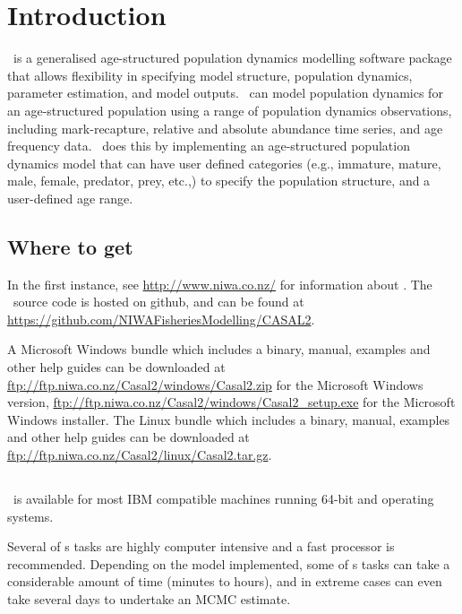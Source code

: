 \section{Introduction\label{sec:Introduction}}

\CNAME\ is a generalised age-structured population dynamics modelling software package that allows flexibility in specifying model structure, population dynamics, parameter estimation, and model outputs. \CNAME\ can model population dynamics for an age-structured population using a range of population dynamics observations, including mark-recapture, relative and absolute abundance time series, and age frequency data. \CNAME\ does this by implementing an age-structured population dynamics model that can have user defined categories (e.g., immature, mature, male, female, predator, prey, etc.,) to specify the population structure, and a user-defined age range. 

\subsection{Where to get \CNAME }

In the first instance, see \url{http://www.niwa.co.nz/} for information about \CNAME . The \CNAME\ source code is hosted on github, and can be found at \url{https://github.com/NIWAFisheriesModelling/CASAL2}.

A Microsoft Windows bundle which includes a binary, manual, examples and other help guides can be downloaded at \url{ftp://ftp.niwa.co.nz/Casal2/windows/Casal2.zip} for the Microsoft Windows version, \url{ftp://ftp.niwa.co.nz/Casal2/windows/Casal2_setup.exe} for the Microsoft Windows installer. The Linux bundle which includes a binary, manual, examples and other help guides can be downloaded at \url{ftp://ftp.niwa.co.nz/Casal2/linux/Casal2.tar.gz}.

\subsection{}

\CNAME\ is available for most IBM compatible machines running 64-bit  and  operating systems.

Several of \CNAME s tasks are highly computer intensive and a fast processor is recommended. Depending on the model implemented, some of \CNAME s tasks can take a considerable amount of time (minutes to hours), and in extreme cases can even take several days to undertake an MCMC estimate. 

